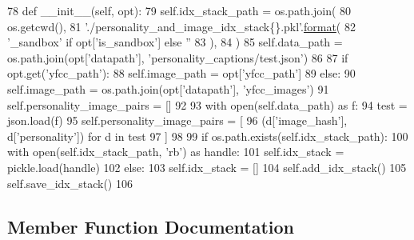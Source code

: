 \begin{DoxyCode}
78     \textcolor{keyword}{def }\_\_init\_\_(self, opt):
79         self.idx\_stack\_path = os.path.join(
80             os.getcwd(),
81             \textcolor{stringliteral}{'./personality\_and\_image\_idx\_stack\{\}.pkl'}.\hyperlink{namespaceparlai_1_1chat__service_1_1services_1_1messenger_1_1shared__utils_a32e2e2022b824fbaf80c747160b52a76}{format}(
82                 \textcolor{stringliteral}{'\_sandbox'} \textcolor{keywordflow}{if} opt[\textcolor{stringliteral}{'is\_sandbox'}] \textcolor{keywordflow}{else} \textcolor{stringliteral}{''}
83             ),
84         )
85         self.data\_path = os.path.join(opt[\textcolor{stringliteral}{'datapath'}], \textcolor{stringliteral}{'personality\_captions/test.json'})
86 
87         \textcolor{keywordflow}{if} opt.get(\textcolor{stringliteral}{'yfcc\_path'}):
88             self.image\_path = opt[\textcolor{stringliteral}{'yfcc\_path'}]
89         \textcolor{keywordflow}{else}:
90             self.image\_path = os.path.join(opt[\textcolor{stringliteral}{'datapath'}], \textcolor{stringliteral}{'yfcc\_images'})
91         self.personality\_image\_pairs = []
92 
93         with open(self.data\_path) \textcolor{keyword}{as} f:
94             test = json.load(f)
95             self.personality\_image\_pairs = [
96                 (d[\textcolor{stringliteral}{'image\_hash'}], d[\textcolor{stringliteral}{'personality'}]) \textcolor{keywordflow}{for} d \textcolor{keywordflow}{in} test
97             ]
98 
99         \textcolor{keywordflow}{if} os.path.exists(self.idx\_stack\_path):
100             with open(self.idx\_stack\_path, \textcolor{stringliteral}{'rb'}) \textcolor{keyword}{as} handle:
101                 self.idx\_stack = pickle.load(handle)
102         \textcolor{keywordflow}{else}:
103             self.idx\_stack = []
104             self.add\_idx\_stack()
105             self.save\_idx\_stack()
106 
\end{DoxyCode}


\subsection{Member Function Documentation}
\mbox{\label{classpersonality__captions_1_1worlds_1_1PersonalityAndImageGenerator_ac246d3fe0a05e842220e73ff837eb2ee}} 
